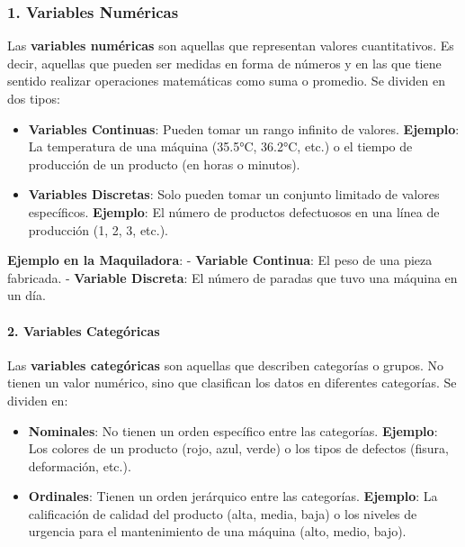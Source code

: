 \documentclass[
  10pt,
  letterpaper,
]{book}
\let\oldparagraph\paragraph
\renewcommand{\paragraph}[1]{\oldparagraph{#1}\mbox{}}
\begin{document}
\subsubsection{\texorpdfstring{1. \textbf{Variables
Numéricas}}{1. Variables Numéricas}}\label{variables-numuxe9ricas}

Las \textbf{variables numéricas} son aquellas que representan valores
cuantitativos. Es decir, aquellas que pueden ser medidas en forma de
números y en las que tiene sentido realizar operaciones matemáticas como
suma o promedio. Se dividen en dos tipos:

\begin{itemize}
\item
  \textbf{Variables Continuas}: Pueden tomar un rango infinito de
  valores. \textbf{Ejemplo}: La temperatura de una máquina (35.5°C,
  36.2°C, etc.) o el tiempo de producción de un producto (en horas o
  minutos).
\item
  \textbf{Variables Discretas}: Solo pueden tomar un conjunto limitado
  de valores específicos. \textbf{Ejemplo}: El número de productos
  defectuosos en una línea de producción (1, 2, 3, etc.).
\end{itemize}

\textbf{Ejemplo en la Maquiladora}: - \textbf{Variable Continua}: El
peso de una pieza fabricada. - \textbf{Variable Discreta}: El número de
paradas que tuvo una máquina en un día.

\paragraph{\texorpdfstring{2. \textbf{Variables
Categóricas}}{2. Variables Categóricas}}\label{variables-categuxf3ricas}

Las \textbf{variables categóricas} son aquellas que describen categorías
o grupos. No tienen un valor numérico, sino que clasifican los datos en
diferentes categorías. Se dividen en:

\begin{itemize}
\item
  \textbf{Nominales}: No tienen un orden específico entre las
  categorías. \textbf{Ejemplo}: Los colores de un producto (rojo, azul,
  verde) o los tipos de defectos (fisura, deformación, etc.).
\item
  \textbf{Ordinales}: Tienen un orden jerárquico entre las categorías.
  \textbf{Ejemplo}: La calificación de calidad del producto (alta,
  media, baja) o los niveles de urgencia para el mantenimiento de una
  máquina (alto, medio, bajo).
\end{itemize}
\end{document}
